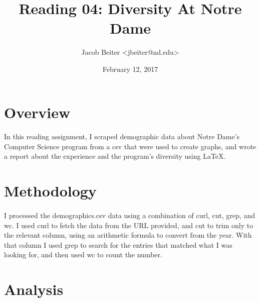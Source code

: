 \documentclass[letterpaper]{article}
\begin{document}

\title{Reading 04: Diversity At Notre Dame}
\date{February 12, 2017}
\author{Jacob Beiter {\textless}jbeiter@nd.edu{\textgreater}}

\maketitle


\section*{Overview}

\paragraph{}

In this reading assignment, I scraped demographic data about Notre Dame's Computer Science program from a csv that were used to create graphs, and wrote a report about the experience and the program's diversity using LaTeX.


\section*{Methodology}

\paragraph{}

I processed the demographics.csv data using a combination of curl, cut, grep, and wc. I used curl to fetch the data from the URL provided, and cut to trim only to the relevant column, using an arithmetic formula to convert from the year. With that column I used grep to search for the entries that matched what I was looking for, and then used wc to count the number.


\section*{Analysis}
\end{document}

